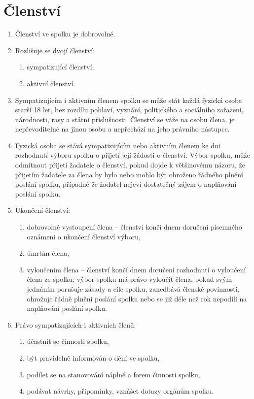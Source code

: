 \documentclass[11pt]{article}
\begin{document}
\section{Členství}
\begin{enumerate}
\item Členství ve spolku je dobrovolné.
\item Rozlišuje se dvojí členství:
\begin{enumerate}
\item sympatizující členství,
\item aktivní členství.
\end{enumerate}
\item Sympatizujícím i aktivním členem spolku se může stát každá fyzická osoba starší 18 let, bez rozdílu pohlaví, vyznání, politického a sociálního zařazení, národnosti, rasy a státní příslušnosti. Členství se váže na osobu člena, je nepřevoditelné na jinou osobu a nepřechází na jeho právního nástupce. 
\item Fyzická osoba se stává sympatizujícím nebo aktivním členem ke dni rozhodnutí výboru spolku o přijetí její žádosti o členství. Výbor spolku, může odmítnout přijetí žadatele o členství, pokud dojde k většinovému názoru, že přijetím žadatele za člena by bylo nebo mohlo být ohroženo řádného plnění poslání spolku, případně že žadatel nejeví dostatečný zájem o naplňování poslání spolku.
\item Ukončení členství:
\begin{enumerate}
\item dobrovolné vystoupení člena – členství končí dnem doručení písemného oznámení o ukončení členství výboru,
\item úmrtím člena,
\item vyloučením člena – členství končí dnem doručení rozhodnutí o vyloučení člena ze spolku; výbor spolku má právo vyloučit člena, pokud svým jednáním porušuje zásady a cíle spolku, zanedbává členské povinnosti, ohrožuje řádně plnění poslání spolku nebo se již déle než rok nepodílí na naplňování poslání spolku.
\end{enumerate}
\item Právo sympatizujících i aktivních členů:
\begin{enumerate}
\item účastnit se činnosti spolku,
\item být pravidelně informován o dění ve spolku,
\item podílet se na stanovování náplně a forem činnosti spolku,
\item podávat návrhy, připomínky, vznášet dotazy orgánům spolku.

\end{enumerate}
\end{enumerate}
\end{document}
